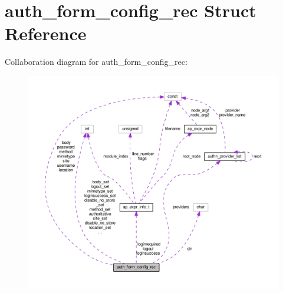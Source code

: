 \hypertarget{structauth__form__config__rec}{}\section{auth\+\_\+form\+\_\+config\+\_\+rec Struct Reference}
\label{structauth__form__config__rec}


Collaboration diagram for auth\+\_\+form\+\_\+config\+\_\+rec\+:
\nopagebreak
\begin{figure}[H]
\begin{center}
\leavevmode
\includegraphics[width=350pt]{structauth__form__config__rec__coll__graph}
\end{center}
\end{figure}
